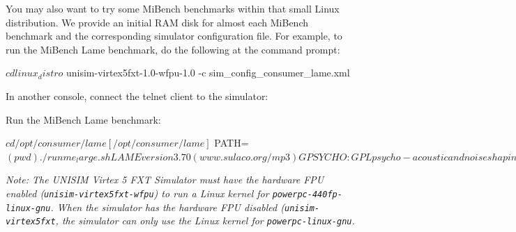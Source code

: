 You may also want to try some MiBench benchmarks within that small Linux distribution.
We provide an initial RAM disk for almost each MiBench benchmark and the corresponding simulator configuration file.
\noindent For example, to run the MiBench Lame benchmark, do the following at the command prompt:

\begin{script}
$ cd linux_distro
$ unisim-virtex5fxt-1.0-wfpu-1.0 -c sim_config_consumer_lame.xml
\end{script}

\noindent In another console, connect the telnet client to the simulator:

\noindent Run the MiBench Lame benchmark:
\begin{script}
[/]$ cd /opt/consumer/lame
[/opt/consumer/lame]$ PATH=$(pwd) ./runme_large.sh
LAME version 3.70 (www.sulaco.org/mp3)
GPSYCHO: GPL psycho-acoustic and noise shaping model version 0.77.
Encoding large.wav to output_large.mp3
Encoding as 44.1 kHz 128 kbps single-ch MPEG1 LayerIII ( 5.5x)  qval=5
    Frame          |  CPU/estimated  |  time/estimated | play/CPU |   ETA
  1149/  1150( 99%
[/opt/consumer/lame]$ 
\end{script}

\textit{Note: The UNISIM Virtex 5 FXT Simulator must have the hardware FPU enabled (\texttt{unisim\--virtex5fxt\--wfpu}) to run a Linux kernel for \texttt{powerpc\--440fp\--linux\--gnu}.
When the simulator has the hardware FPU disabled (\texttt{unisim\--virtex5fxt}, the simulator can only use the Linux kernel for \texttt{powerpc\--linux\--gnu}.}
